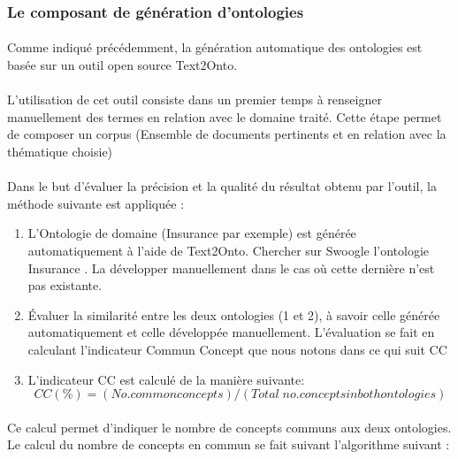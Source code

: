 \documentclass[12pt, a4paper, oneside]{book}
\begin{document}
\subsubsection{Le composant de génération d'ontologies}
\paragraph{}
Comme indiqué précédemment, la génération automatique des ontologies est basée sur un outil open source Text2Onto.
\paragraph{}
L'utilisation de cet outil consiste dans un premier temps à renseigner manuellement des termes en relation avec le domaine traité. 
Cette étape permet de composer un corpus (Ensemble de documents pertinents et en relation avec la thématique choisie)
\paragraph{}
Dans le but d'évaluer la précision et la qualité du résultat obtenu par l'outil, la méthode suivante est appliquée :
\begin{enumerate}
\item L'Ontologie de domaine (Insurance par exemple) est générée automatiquement à l'aide de Text2Onto.
Chercher sur Swoogle l'ontologie Insurance \citep{swoogle}. La développer manuellement dans le cas où cette dernière n'est pas existante.
\item Évaluer la similarité entre les deux ontologies (1 et 2), à savoir celle générée automatiquement et celle développée manuellement. L'évaluation se fait en calculant l'indicateur Commun Concept que nous notons dans ce qui suit CC

\item L'indicateur CC est calculé de la manière suivante: $$CC (\%) = (No. common concepts) / (Total\;no. concepts in both ontologies)$$

\end{enumerate}




\paragraph{}
Ce calcul permet d'indiquer le nombre de concepts communs aux deux ontologies.
Le calcul du nombre de concepts en commun se fait suivant l'algorithme suivant : 
\end{document}
